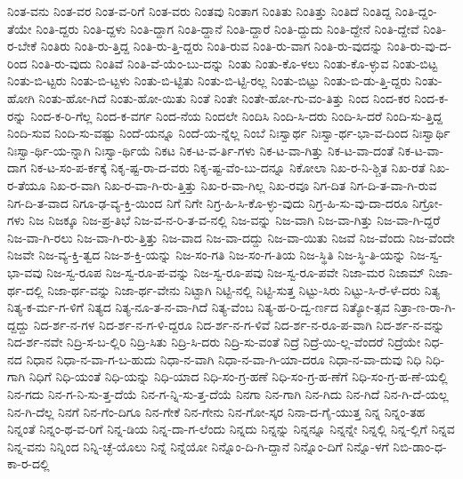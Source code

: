{ನಿಂತ-ವನು
ನಿಂತ-ವರ
ನಿಂತ-ವ-ರಿಗೆ
ನಿಂತ-ವರು
ನಿಂತವು
ನಿಂತಾಗ
ನಿಂತಿತು
ನಿಂತಿತ್ತು
ನಿಂತಿದೆ
ನಿಂತಿದ್ದ
ನಿಂತಿ-ದ್ದಂ-ತೆಯೇ
ನಿಂತಿ-ದ್ದರು
ನಿಂತಿ-ದ್ದಳು
ನಿಂತಿ-ದ್ದಾಗ
ನಿಂತಿ-ದ್ದಾನೆ
ನಿಂತಿ-ದ್ದಾರೆ
ನಿಂತಿ-ದ್ದುದು
ನಿಂತಿ-ದ್ದೇನೆ
ನಿಂತಿ-ದ್ದೇವೆ
ನಿಂತಿ-ರ-ಬೇಕೆ
ನಿಂತಿರು
ನಿಂತಿ-ರು-ತ್ತಿದ್ದ
ನಿಂತಿ-ರು-ತ್ತಿ-ದ್ದರು
ನಿಂತಿ-ರುವ
ನಿಂತಿ-ರು-ವಾಗ
ನಿಂತಿ-ರು-ವುದನ್ನು
ನಿಂತಿ-ರು-ವು-ದ-ರಿಂದ
ನಿಂತಿ-ರು-ವುದು
ನಿಂತಿವೆ
ನಿಂತಿ-ವೆ-ಯೆಂ-ಬು-ದನ್ನು
ನಿಂತು
ನಿಂತು-ಕೊ-ಳಲು
ನಿಂತು-ಕೊ-ಳ್ಳುವ
ನಿಂತು-ಬಿಟ್ಟ
ನಿಂತು-ಬಿ-ಟ್ಟರು
ನಿಂತು-ಬಿ-ಟ್ಟಳು
ನಿಂತು-ಬಿ-ಟ್ಟಿತು
ನಿಂತು-ಬಿ-ಟ್ಟಿ-ರಲ್ಲ
ನಿಂತು-ಬಿಟ್ಟು
ನಿಂತು-ಬಿ-ಡು-ತ್ತಿ-ದ್ದರು
ನಿಂತು-ಹೋಗಿ
ನಿಂತು-ಹೋ-ಗಿದೆ
ನಿಂತು-ಹೋ-ಯಿತು
ನಿಂತೆ
ನಿಂತೇ
ನಿಂತೇ-ಹೋ-ಗು-ವಂ-ತಿತ್ತು
ನಿಂದ
ನಿಂದ-ಕರ
ನಿಂದ-ಕ-ರನ್ನು
ನಿಂದ-ಕ-ರಿ-ಗೆಲ್ಲ
ನಿಂದ-ಕ-ವರ್ಗ
ನಿಂದ-ನೆಯ
ನಿಂದಲೇ
ನಿಂದಿಸಿ
ನಿಂದಿ-ಸಿ-ದರು
ನಿಂದಿ-ಸಿ-ದರೆ
ನಿಂದಿ-ಸು-ತ್ತಿದ್ದ
ನಿಂದಿ-ಸುವ
ನಿಂದಿ-ಸು-ವಷ್ಟು
ನಿಂದೆ-ಯನ್ನೂ
ನಿಂದೆ-ಯ-ನ್ನೆಲ್ಲ
ನಿಂಬೆ
ನಿಃಸ್ವಾರ್ಥ
ನಿಃಸ್ವಾ-ರ್ಥ-ಭಾ-ವ-ದಿಂದ
ನಿಃಸ್ವಾರ್ಥಿ
ನಿಃಸ್ವಾ-ರ್ಥಿ-ಯ-ನ್ನಾಗಿ
ನಿಃಸ್ವಾ-ರ್ಥಿಯೆ
ನಿಕಟ
ನಿಕ-ಟ-ವ-ರ್ತಿ-ಗಳು
ನಿಕ-ಟ-ವಾ-ಗಿತ್ತು
ನಿಕ-ಟ-ವಾ-ದಂತೆ
ನಿಕ-ಟ-ವಾ-ದಾಗ
ನಿಕ-ಟ-ಸಂ-ಪ-ರ್ಕಕ್ಕೆ
ನಿಕೃ-ಷ್ಟ-ರಾ-ದ-ವರು
ನಿಕೃ-ಷ್ಟ-ವೆಂ-ಬು-ದನ್ನೂ
ನಿಕೋಲಾ
ನಿಖ-ರ-ನಿ-ಶ್ಚಿತ
ನಿಖ-ರತೆ
ನಿಖ-ರ-ತೆಯೂ
ನಿಖ-ರ-ವಾಗಿ
ನಿಖ-ರ-ವಾ-ಗಿ-ರು-ತ್ತಿತ್ತು
ನಿಖ-ರ-ವಾ-ಗಿಲ್ಲ
ನಿಖ-ರವೂ
ನಿಗ-ದಿತ
ನಿಗ-ದಿ-ತ-ವಾ-ಗಿ-ರುವ
ನಿಗ-ದಿ-ತ-ವಾದ
ನಿಗೂ-ಢ-ವ್ಯ-ಕ್ತಿ-ಯಿಂದ
ನಿಗೆ
ನಿಗೇ
ನಿಗ್ರ-ಹಿ-ಸಿ-ಕೊ-ಳ್ಳು-ವುದು
ನಿಗ್ರ-ಹಿ-ಸು-ವು-ದಾ-ದರೂ
ನಿಗ್ರೋ-ಗಳು
ನಿಜ
ನಿಜಕ್ಕೂ
ನಿಜ-ಪ್ರ-ತಿಭೆ
ನಿಜ-ವ-ನ-ರಿ-ತ-ವ-ನಲ್ಲಿ
ನಿಜ-ವನ್ನು
ನಿಜ-ವಾಗಿ
ನಿಜ-ವಾ-ಗಿತ್ತು
ನಿಜ-ವಾ-ಗಿ-ದ್ದರೆ
ನಿಜ-ವಾ-ಗಿ-ರಲು
ನಿಜ-ವಾ-ಗಿ-ರು-ತ್ತಿತ್ತು
ನಿಜ-ವಾದ
ನಿಜ-ವಾ-ದದ್ದು
ನಿಜ-ವಾ-ಯಿತು
ನಿಜವೆ
ನಿಜ-ವೆಂದು
ನಿಜ-ವೆಂದೇ
ನಿಜವೇ
ನಿಜ-ವ್ಯ-ಕ್ತಿ-ತ್ವದ
ನಿಜ-ಶ-ಕ್ತಿ-ಯನ್ನು
ನಿಜ-ಸಂ-ಗತಿ
ನಿಜ-ಸಂ-ಗ-ತಿಯ
ನಿಜ-ಸ್ಥಿತಿ
ನಿಜ-ಸ್ಥಿ-ತಿ-ಯನ್ನು
ನಿಜ-ಸ್ವ-ಭಾ-ವವು
ನಿಜ-ಸ್ವ-ರೂಪ
ನಿಜ-ಸ್ವ-ರೂ-ಪ-ವನ್ನು
ನಿಜ-ಸ್ವ-ರೂ-ಪವು
ನಿಜ-ಸ್ವ-ರೂ-ಪವೇ
ನಿಜಾ-ಮರ
ನಿಜಾಮ್
ನಿಜಾ-ರ್ಥ-ದಲ್ಲಿ
ನಿಜಾ-ರ್ಥ-ವನ್ನು
ನಿಜಾ-ರ್ಥ-ವೇನು
ನಿಟ್ಟಾಗಿ
ನಿಟ್ಟಿ-ನಲ್ಲಿ
ನಿಟ್ಟಿ-ಸುತ್ತ
ನಿಟ್ಟು-ಸಿರು
ನಿಟ್ಟು-ಸಿ-ರೆ-ಳೆ-ದರು
ನಿತ್ಯ
ನಿತ್ಯ-ಕ-ರ್ಮ-ಗ-ಳಿಗೆ
ನಿತ್ಯದ
ನಿತ್ಯ-ನೂ-ತ-ನ-ವಾ-ಗಿದೆ
ನಿತ್ಯ-ವೆಂಬ
ನಿತ್ಯ-ಹ-ರಿ-ದ್ವ-ರ್ಣದ
ನಿತ್ಯೋ-ತ್ಸವ
ನಿತ್ರಾ-ಣ-ರಾ-ಗಿ-ದ್ದದ್ದು
ನಿದ-ರ್ಶ-ನ-ಗಳ
ನಿದ-ರ್ಶ-ನ-ಗ-ಳಿ-ದ್ದರೂ
ನಿದ-ರ್ಶ-ನ-ಗ-ಳಿವೆ
ನಿದ-ರ್ಶ-ನ-ರೂ-ಪ-ವಾಗಿ
ನಿದ-ರ್ಶ-ನ-ವನ್ನು
ನಿದ-ರ್ಶ-ನವೇ
ನಿದ್ರಿ-ಸ-ಬ-ಲ್ಲಿರಿ
ನಿದ್ರಿ-ಸಿತು
ನಿದ್ರಿ-ಸಿ-ದರು
ನಿದ್ರಿ-ಸು-ವಂತೆ
ನಿದ್ರೆ
ನಿದ್ರೆ-ಯಿ-ಲ್ಲ-ವೆಂದರೆ
ನಿದ್ರೆಯೇ
ನಿಧ-ನದ
ನಿಧಾನ
ನಿಧಾ-ನ-ವಾ-ಗ-ಬ-ಹುದು
ನಿಧಾ-ನ-ವಾಗಿ
ನಿಧಾ-ನ-ವಾ-ಗಿ-ಯಾ-ದರೂ
ನಿಧಾ-ನ-ವಾ-ದುವು
ನಿಧಿ
ನಿಧಿ-ಗಾಗಿ
ನಿಧಿಗೆ
ನಿಧಿ-ಯಂತೆ
ನಿಧಿ-ಯನ್ನು
ನಿಧಿ-ಯಾದ
ನಿಧಿ-ಸಂ-ಗ್ರ-ಹಣೆ
ನಿಧಿ-ಸಂ-ಗ್ರ-ಹ-ಣೆಗೆ
ನಿಧಿ-ಸಂ-ಗ್ರ-ಹ-ಣೆ-ಯಲ್ಲಿ
ನಿನ-ಗದು
ನಿನ-ಗ-ನಿ-ಸು-ತ್ತ-ದೆಯೆ
ನಿನ-ಗ-ನ್ನಿ-ಸು-ತ್ತ-ದೆಯೆ
ನಿನಗಾ
ನಿನ-ಗಾಗಿ
ನಿನ-ಗಿದು
ನಿನ-ಗಿದೆ
ನಿನ-ಗಿ-ದೆ-ಯಲ್ಲ
ನಿನ-ಗಿ-ದೆಲ್ಲ
ನಿನಗೆ
ನಿನ-ಗೆಂ-ದಿಗೂ
ನಿನ-ಗೇಕೆ
ನಿನ-ಗೇನು
ನಿನ-ಗೋ-ಸ್ಕರ
ನಿನಾ-ದ-ಗೈ-ಯುತ್ತ
ನಿನ್ನ
ನಿನ್ನಂ-ತಹ
ನಿನ್ನಂತೆ
ನಿನ್ನಂ-ಥ-ವ-ರಿಗೆ
ನಿನ್ನ-ಡಿಯ
ನಿನ್ನ-ದಾ-ಗ-ಲೆಂದು
ನಿನ್ನದು
ನಿನ್ನನ್ನು
ನಿನ್ನನ್ನೂ
ನಿನ್ನನ್ನೇ
ನಿನ್ನಲ್ಲಿ
ನಿನ್ನ-ಲ್ಲಿಗೆ
ನಿನ್ನವ
ನಿನ್ನ-ವನು
ನಿನ್ನಿಂದ
ನಿನ್ನಿ-ಚ್ಛೆ-ಯೊಲು
ನಿನ್ನೆ
ನಿನ್ನೆಯೋ
ನಿನ್ನೊಂ-ದಿ-ಗಿ-ದ್ದಾನೆ
ನಿನ್ನೊಂ-ದಿಗೆ
ನಿನ್ನೊ-ಳಗೆ
ನಿಬಿ-ಡಾಂ-ಧ-ಕಾ-ರ-ದಲ್ಲಿ
}
